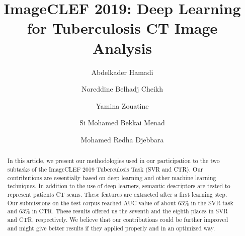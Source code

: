 \documentclass{llncs}
\begin{document}
%
\title{ImageCLEF 2019: Deep Learning for Tuberculosis CT Image Analysis}
%
%
\author{Abdelkader Hamadi \and Noreddine Belhadj Cheikh \and Yamina Zouatine \and Si Mohamed Bekkai Menad \and Mohamed Redha Djebbara}




%
%




%
\maketitle              %
%
\begin{abstract}
In this article, we present our methodologies used in our participation to the two subtasks of the ImageCLEF 2019 Tuberculosis Task (SVR and CTR). Our contributions are essentially based on deep learning and other machine learning techniques. In addition to the use of deep learners, semantic descriptors are tested to represent patients CT scans. These features are extracted after a first learning step. Our submissions on the test corpus reached AUC value of about 65\% in the SVR task and 63\% in CTR. These results offered us the seventh and the eighth places in SVR and CTR, respectively. We believe that our contributions could be further improved and might give better results if they applied properly and in an optimized way.

\end{abstract}
%
%
%
\end{document}
